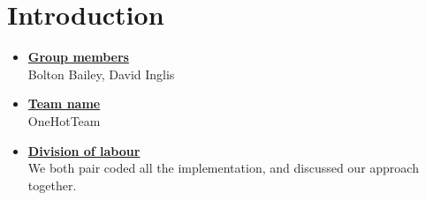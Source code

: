\newif\ifshowsolutions
\showsolutionstrue

\newcommand{\boldline}[1]{\underline{\textbf{#1}}}



\pagestyle{fancy}






\section{Introduction}
\medskip
\begin{itemize}

    \item \boldline{Group members} \\
    Bolton Bailey, David Inglis

    \item \boldline{Team name} \\
    OneHotTeam

    \item \boldline{Division of labour} \\
    We both pair coded all the implementation, and discussed our approach together.

\end{itemize}



